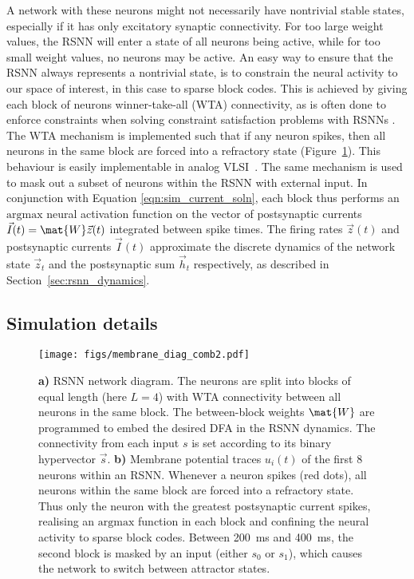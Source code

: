 A network with these neurons might not necessarily have nontrivial stable states, especially if it has only excitatory synaptic connectivity. For too large weight values, the RSNN will enter a state of all neurons being active, while for too small weight values, no neurons may be active. An easy way to ensure that the RSNN always represents a nontrivial state, is to constrain the neural activity to our space of interest, in this case to sparse block codes. This is achieved by giving each block of neurons winner-take-all (WTA) connectivity, as is often done to enforce constraints when solving constraint satisfaction problems with RSNNs \cite{Mostafa_etal15}. The WTA mechanism is implemented such that if any neuron spikes, then all neurons in the same block are forced into a refractory state \mbox{(Figure \ref{fig:diagram_and_membranes_wta})}. This behaviour is easily implementable in analog VLSI~\cite{cotteret_robust_2023, abrahamsen_time_2004}.
The same mechanism is used to mask out a subset of neurons within the RSNN with external input.
In conjunction with Equation \ref{eqn:sim_current_soln},
each block thus performs an $\mathrm{argmax}$ neural activation function on the vector of postsynaptic currents $\vec{I}(t) = \mat{W}\vec{z}(t)$ integrated between spike times. The firing rates $\vec{z}(t)$ and postsynaptic currents $\vec{I}(t)$ approximate the discrete dynamics of the network state $\vec{z}_t$ and the postsynaptic sum $\vec{h}_t$ respectively, as described in \mbox{Section \ref{sec:rsnn_dynamics}}.

\subsection{Simulation details}
\label{sec:sim_details}

\begin{figure*}
    \centering
    \texttt{[image: figs/membrane\_diag\_comb2.pdf]}
    \caption{\textbf{a)} RSNN network diagram. The neurons are split into blocks of equal length (here $L=4$) with WTA connectivity between all neurons in the same block. The between-block weights $\mat{W}$ are programmed to embed the desired DFA in the RSNN dynamics. The connectivity from each input $s$ is set according to its binary hypervector $\vec{s}$. \textbf{b)} Membrane potential traces $u_i(t)$ of the first 8 neurons within an RSNN. Whenever a neuron spikes (red dots), all neurons within the same block are forced into a refractory state. Thus only the neuron with the greatest postsynaptic current spikes, realising an $\mathrm{argmax}$ function in each block and confining the neural activity to sparse block codes. Between \qty{200}{ms} and \qty{400}{ms}, the second block is masked by an input (either $s_0$ or $s_1$), which causes the network to switch between attractor states.}
    \label{fig:diagram_and_membranes_wta}
\end{figure*}

